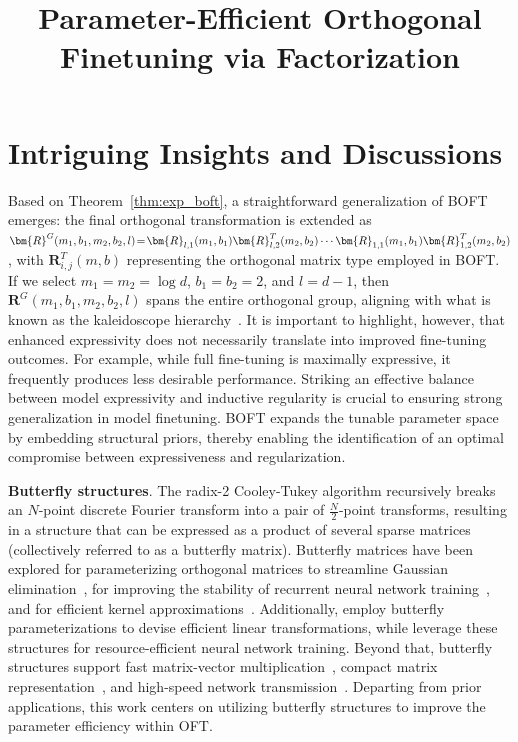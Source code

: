 \title{Parameter-Efficient Orthogonal Finetuning via Factorization}
\section{Intriguing Insights and Discussions}



Based on Theorem~\ref{thm:exp_boft}, a straightforward generalization of BOFT emerges: the final orthogonal transformation is extended as $\thickmuskip=2mu \medmuskip=2mu \bm{R}^G(m_1,b_1,m_2,b_2,l)=\bm{R}_{l,1}(m_1,b_1)\bm{R}_{l,2}^T(m_2,b_2)\cdots\bm{R}_{1,1}(m_1,b_1)\bm{R}_{1,2}^T(m_2,b_2)$, with $\bm{R}_{i,j}^T(m,b)$ representing the orthogonal matrix type employed in BOFT. If we select $m_1=m_2=\log d$, $b_1=b_2=2$, and $l=d-1$, then $\bm{R}^G(m_1,b_1,m_2,b_2,l)$ spans the entire orthogonal group, aligning with what is known as the kaleidoscope hierarchy~\cite{dao2019kaleidoscope}. It is important to highlight, however, that enhanced expressivity does not necessarily translate into improved fine-tuning outcomes. For example, while full fine-tuning is maximally expressive, it frequently produces less desirable performance. Striking an effective balance between model expressivity and inductive regularity is crucial to ensuring strong generalization in model finetuning. BOFT expands the tunable parameter space by embedding structural priors, thereby enabling the identification of an optimal compromise between expressiveness and regularization.

\textbf{Butterfly structures}. The radix-2 Cooley-Tukey algorithm recursively breaks an $N$-point discrete Fourier transform into a pair of $\frac{N}{2}$-point transforms, resulting in a structure that can be expressed as a product of several sparse matrices (collectively referred to as a butterfly matrix). Butterfly matrices have been explored for parameterizing orthogonal matrices to streamline Gaussian elimination~\cite{parker1995random}, for improving the stability of recurrent neural network training~\cite{jing2017tunable}, and for efficient kernel approximations~\cite{munkhoeva2018quadrature}. Additionally, \cite{dao2019learning,dao2019kaleidoscope} employ butterfly parameterizations to devise efficient linear transformations, while \cite{chen2022pixelated,dao2022monarch} leverage these structures for resource-efficient neural network training. Beyond that, butterfly structures support fast matrix-vector multiplication~\cite{michielssen1996multilevel,o2010algorithm}, compact matrix representation~\cite{li2015butterfly}, and high-speed network transmission~\cite{klasing1994broadcasting,li2003linear,rajasingh2016transmission}. Departing from prior applications, this work centers on utilizing butterfly structures to improve the parameter efficiency within OFT.

